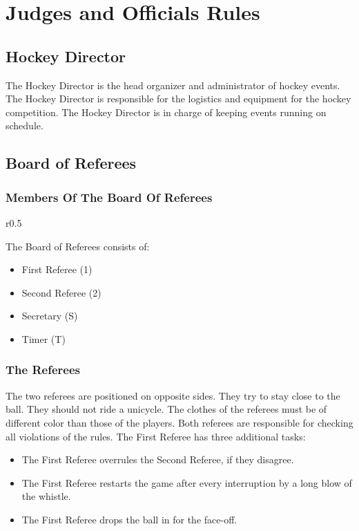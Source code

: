 \chapter{Judges and Officials Rules}

\section{Hockey Director}

The Hockey Director is the head organizer and administrator of hockey events.
The Hockey Director is responsible for the logistics and equipment for the hockey competition.
The Hockey Director is in charge of keeping events running on schedule.

\section{Board of Referees}

\subsection{Members Of The Board Of Referees}
\begin{wrapfigure}[5]{r}{0.5\textwidth}
\centering

\end{wrapfigure}

The Board of Referees consists of:
\begin{itemize}
\item First Referee (1)
\item Second Referee (2)
\item Secretary (S)
\item Timer (T)
\end{itemize}

\subsection{The Referees}
The two referees are positioned on opposite sides.
They try to stay close to the ball.
They should not ride a unicycle.
The clothes of the referees must be of different color than those of the players.
Both referees are responsible for checking all violations of the rules.
The First Referee has three additional tasks:
\begin{itemize}
\item The First Referee overrules the Second Referee, if they disagree.
\item The First Referee restarts the game after every interruption by a long blow of the whistle.
\item The First Referee drops the ball in for the face-off.
\end{itemize}

